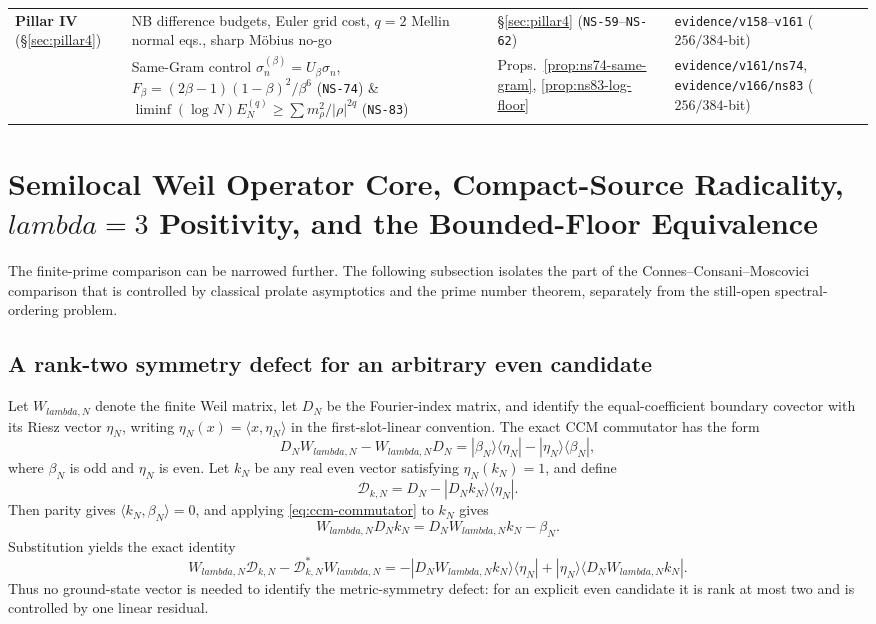 \documentclass[11pt]{article}
\def\lambda{lambda}%
\theoremstyle{remark}
\begin{document}
\begin{table}[htbp]
\begin{tabular}{>{\raggedright\arraybackslash}p{2.0cm}>{\raggedright\arraybackslash}p{5.2cm}>{\raggedright\arraybackslash}p{3.4cm}>{\raggedright\arraybackslash}p{3.9cm}}
\midrule
\textbf{Pillar IV} (\S\ref{sec:pillar4}) & NB difference budgets, Euler grid cost, $q=2$ Mellin normal eqs., sharp M\"obius no-go & \S\ref{sec:pillar4} (\texttt{NS-59}--\texttt{NS-62}) & \texttt{evidence/v158}--\texttt{v161} ($256/384$-bit) \\
 & Same-Gram control $\sigma_n^{(\beta)}=U_\beta\sigma_n$, $F_\beta=(2\beta-1)(1-\beta)^2/\beta^6$ (\texttt{NS-74}) \& $\liminf(\log N)E_N^{(q)}\ge\sum m_\rho^2/|\rho|^{2q}$ (\texttt{NS-83}) & Props.~\ref{prop:ns74-same-gram}, \ref{prop:ns83-log-floor} & \texttt{evidence/v161/ns74}, \texttt{evidence/v166/ns83} ($256/384$-bit) \\
\bottomrule
\end{tabular}
\end{table}


\section{Semilocal Weil Operator Core, Compact-Source Radicality, \texorpdfstring{$\lambda=3$}{lambda=3} Positivity, and the Bounded-Floor Equivalence}\label{sec:g1}
The finite-prime comparison can be narrowed further.  The following subsection isolates the part of the Connes--Consani--Moscovici comparison that is controlled by classical prolate asymptotics and the prime number theorem, separately from the still-open spectral-ordering problem.

\subsection{A rank-two symmetry defect for an arbitrary even candidate}
Let $W_{\lambda,N}$ denote the finite Weil matrix, let $D_N$ be the Fourier-index matrix, and identify the equal-coefficient boundary covector with its Riesz vector $\eta_N$, writing $\eta_N(x)=\langle x,\eta_N\rangle$ in the first-slot-linear convention.  The exact CCM commutator has the form
\begin{equation}\label{eq:ccm-commutator}
 D_NW_{\lambda,N}-W_{\lambda,N}D_N
 =|\beta_N\rangle\langle\eta_N|-|\eta_N\rangle\langle\beta_N|,
\end{equation}
where $\beta_N$ is odd and $\eta_N$ is even.  Let $k_N$ be any real even vector satisfying $\eta_N(k_N)=1$, and define
\[
 \mathcal D_{k,N}=D_N-|D_Nk_N\rangle\langle\eta_N|.
\]
Then parity gives $\langle k_N,\beta_N\rangle=0$, and applying \eqref{eq:ccm-commutator} to $k_N$ gives
\[
 W_{\lambda,N}D_Nk_N=D_NW_{\lambda,N}k_N-\beta_N.
\]
Substitution yields the exact identity
\begin{equation}\label{eq:ranktwo-weil-defect}
 \boxed{
 W_{\lambda,N}\mathcal D_{k,N}
 -\mathcal D_{k,N}^{*}W_{\lambda,N}
 =-|D_NW_{\lambda,N}k_N\rangle\langle\eta_N|
  +|\eta_N\rangle\langle D_NW_{\lambda,N}k_N|.}
\end{equation}
Thus no ground-state vector is needed to identify the metric-symmetry defect: for an explicit even candidate it is rank at most two and is controlled by one linear residual.
\end{document}
